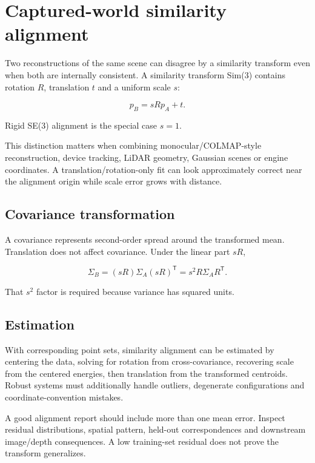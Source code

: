 \hypertarget{appendix-5f40b4fea463}{}\label{referencestart:appendix-5f40b4fea463}
\section{Captured-world similarity alignment}\label{appendix-5f40b4fea463-captured-world-similarity-alignment}

Two reconstructions of the same scene can disagree by a similarity transform even when both are internally consistent. A similarity transform Sim(3) contains rotation \(R\), translation \(t\) and a uniform scale \(s\):

\[
p_B = sRp_A+t.
\]

Rigid SE(3) alignment is the special case \(s=1\).

This distinction matters when combining monocular/COLMAP-style reconstruction, device tracking, LiDAR geometry, Gaussian scenes or engine coordinates. A translation/rotation-only fit can look approximately correct near the alignment origin while scale error grows with distance.

\subsection{Covariance transformation}\label{appendix-5f40b4fea463-covariance-transformation}

A covariance represents second-order spread around the transformed mean. Translation does not affect covariance. Under the linear part \(sR\),

\[
\Sigma_B
=
(sR)\Sigma_A(sR)^{\mathsf T}
=
s^2 R\Sigma_A R^{\mathsf T}.
\]

That \(s^2\) factor is required because variance has squared units.

\subsection{Estimation}\label{appendix-5f40b4fea463-estimation}

With corresponding point sets, similarity alignment can be estimated by centering the data, solving for rotation from cross-covariance, recovering scale from the centered energies, then translation from the transformed centroids. Robust systems must additionally handle outliers, degenerate configurations and coordinate-convention mistakes.

A good alignment report should include more than one mean error. Inspect residual distributions, spatial pattern, held-out correspondences and downstream image/depth consequences. A low training-set residual does not prove the transform generalizes.

